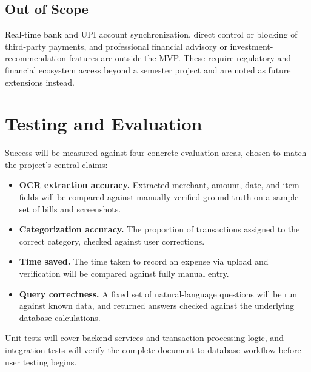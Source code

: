 \documentclass[11pt,a4paper]{article}
\begin{document}
\subsection{Out of Scope}

Real-time bank and UPI account synchronization, direct control or
blocking of third-party payments, and professional financial advisory or
investment-recommendation features are outside the MVP. These require
regulatory and financial ecosystem access beyond a semester project and
are noted as future extensions instead.


\section{Testing and Evaluation}

Success will be measured against four concrete evaluation areas, chosen
to match the project's central claims:

\begin{itemize}

    \item \textbf{OCR extraction accuracy.} Extracted merchant, amount,
    date, and item fields will be compared against manually verified
    ground truth on a sample set of bills and screenshots.

    \item \textbf{Categorization accuracy.} The proportion of
    transactions assigned to the correct category, checked against
    user corrections.

    \item \textbf{Time saved.} The time taken to record an expense via
    upload and verification will be compared against fully manual entry.

    \item \textbf{Query correctness.} A fixed set of natural-language
    questions will be run against known data, and returned answers
    checked against the underlying database calculations.

\end{itemize}

Unit tests will cover backend services and transaction-processing logic,
and integration tests will verify the complete document-to-database
workflow before user testing begins.

\end{document}
